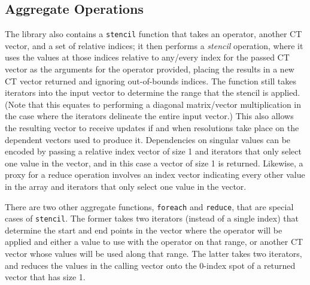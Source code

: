 \subsection{Aggregate Operations}
The library also contains a \texttt{stencil} function that takes an operator,
another CT vector, and a set of relative indices; it then performs a 
\textit{stencil} operation, where it uses the values at those indices relative to
any/every index for the passed CT vector as the arguments for the operator
provided, placing the results in a new CT vector returned and ignoring
out-of-bounds indices. The function still takes iterators into the input vector
to determine the range that the stencil is applied. (Note that this equates to
performing a diagonal matrix/vector multiplication in the case where the iterators
delineate the entire input vector.) This also allows the resulting vector to
receive updates if and when resolutions take place on the dependent vectors used
to produce it. Dependencies on singular values can be encoded by passing a
relative index vector of size 1 and iterators that only select one value in the
vector, and in this case a vector of size 1 is returned. Likewise, a proxy for a
reduce operation involves an index vector indicating every other value in the
array and iterators that only select one value in the vector.

There are two other aggregate functions, \texttt{foreach} and \texttt{reduce},
that are special cases of \texttt{stencil}. The former takes two iterators
(instead of a single index) that determine the start and end points in the
vector where the operator will be applied and either a value to use with the
operator on that range, or another CT vector whose values will be used along
that range. The latter takes two iterators, and reduces the values in the
calling vector onto the 0-index spot of a returned vector that has size 1.


